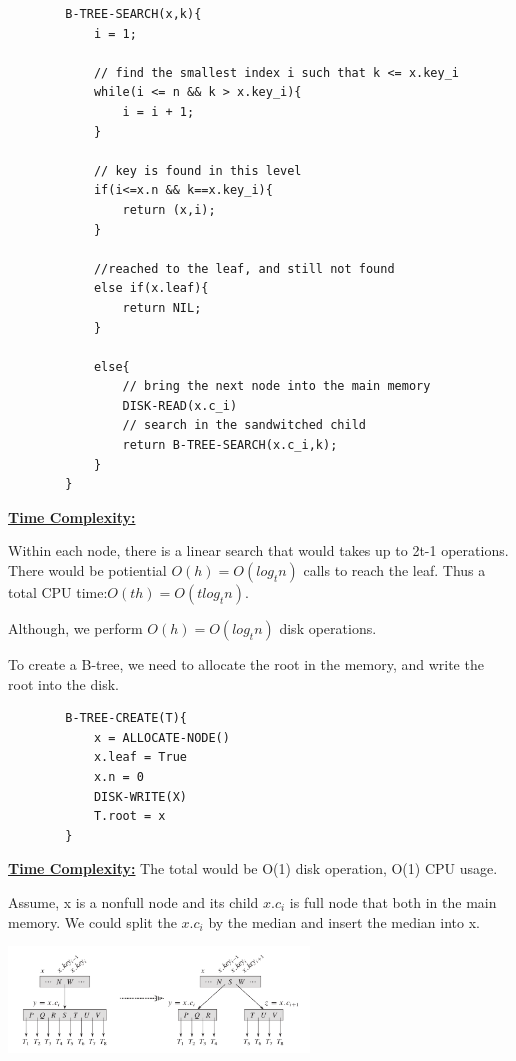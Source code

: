 
    \begin{lstlisting}
        B-TREE-SEARCH(x,k){
            i = 1;

            // find the smallest index i such that k <= x.key_i
            while(i <= n && k > x.key_i){
                i = i + 1;
            }
            
            // key is found in this level
            if(i<=x.n && k==x.key_i){
                return (x,i);
            }

            //reached to the leaf, and still not found
            else if(x.leaf){
                return NIL;
            }

            else{
                // bring the next node into the main memory
                DISK-READ(x.c_i)
                // search in the sandwitched child
                return B-TREE-SEARCH(x.c_i,k);
            }
        }
    \end{lstlisting}

    \textbf{\underline{Time Complexity:}}

    Within each node, there is a linear search that would takes up to 2t-1 operations.
    There would be potiential $O(h) = O(log_t n)$ calls to reach the leaf. Thus 
    a total CPU time:$O(th) = O(tlog_t n)$.

    Although, we perform $O(h) = O(log_t n)$ disk operations.


    To create a B-tree, we need to allocate the root in the memory, and write 
    the root into the disk.

    \begin{lstlisting}
        B-TREE-CREATE(T){
            x = ALLOCATE-NODE()
            x.leaf = True
            x.n = 0
            DISK-WRITE(X)
            T.root = x
        }
    \end{lstlisting}

    \textbf{\underline{Time Complexity:}}
    The total would be O(1) disk operation, O(1) CPU usage.


    Assume, x is a nonfull node and its child $x.c_i$ is full node that both in the 
    main memory. We could split the $x.c_i$ by the median and insert the median 
    into x. 

    \includegraphics[width=0.6\textwidth]{contents/Advanced_Data_Structure/B_Tree/Images/B_tree_splitr.png}

